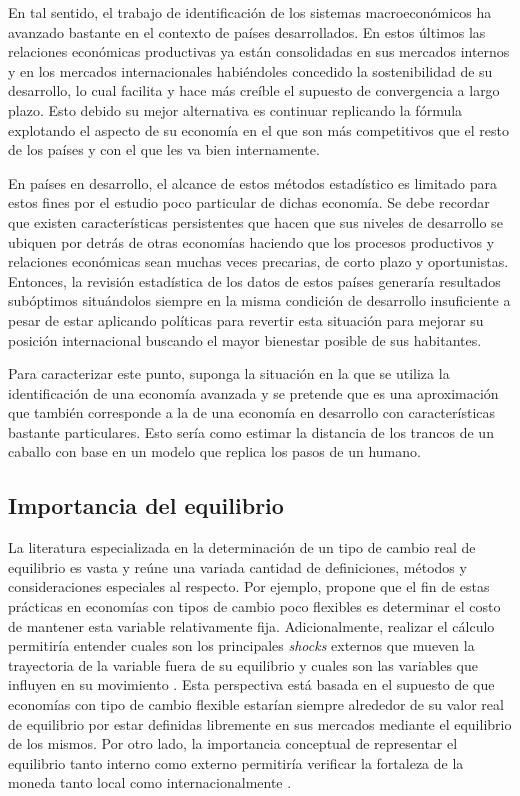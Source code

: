 \documentclass[12pt,letterpaper]{article}
\begin{document}
En tal sentido, el trabajo de identificación de los sistemas macroeconómicos ha avanzado bastante en el contexto de países desarrollados. En estos últimos las relaciones económicas productivas ya están  consolidadas en sus mercados internos y en los mercados internacionales habiéndoles concedido la sostenibilidad de su desarrollo, lo cual facilita y hace más creíble el supuesto de convergencia a largo plazo. Esto debido su mejor alternativa es continuar replicando la fórmula explotando el aspecto de su economía en el que son más competitivos que el resto de los países y con el que les va bien internamente. 

En países en desarrollo, el alcance de estos métodos estadístico es limitado para estos fines por el estudio poco particular de dichas economía. Se debe recordar que existen características persistentes que hacen que sus niveles de desarrollo se ubiquen por detrás de otras economías haciendo que los procesos productivos y relaciones económicas sean muchas veces precarias, de corto plazo y oportunistas. Entonces, la revisión estadística de los datos de estos países generaría resultados subóptimos situándolos siempre en la misma condición de desarrollo insuficiente a pesar de estar aplicando políticas para revertir esta situación para mejorar su posición internacional buscando el mayor bienestar posible de sus habitantes. 

Para caracterizar este punto, suponga la situación en la que se utiliza la identificación de una economía avanzada y se pretende que es una aproximación que también corresponde a la de una economía en desarrollo con características bastante particulares. Esto sería como estimar la distancia de los trancos de un caballo con base en un modelo que replica los pasos de un humano.


\subsection*{Importancia del equilibrio}
La literatura especializada en la determinación de un tipo de cambio real de equilibrio es vasta y reúne una variada cantidad de definiciones, métodos y consideraciones especiales al respecto. Por ejemplo, \cite{driver2005concepts} propone que el fin de estas prácticas en economías con tipos de cambio poco flexibles es determinar el costo de mantener esta variable relativamente fija. Adicionalmente, realizar el cálculo permitiría entender cuales son los principales \emph{shocks} externos que mueven la trayectoria de la variable fuera de su equilibrio y cuales son las variables que influyen en su movimiento \citep{macdonald2000concepts}. Esta perspectiva está basada en el supuesto de que economías con tipo de cambio flexible estarían siempre alrededor de su valor real de equilibrio por estar definidas libremente en sus mercados mediante el equilibrio de los mismos. Por otro lado, la importancia conceptual de representar el equilibrio tanto interno como externo permitiría verificar la fortaleza de la moneda tanto local como internacionalmente \citep{akrama2003real}.
\end{document}
